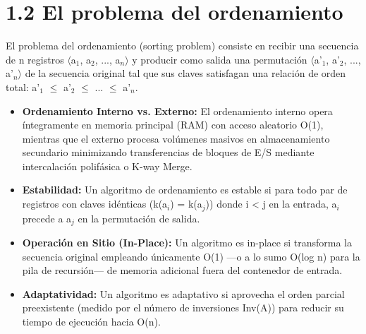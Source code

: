 \documentclass[11pt,letterpaper]{article}
\begin{document}
\section*{1.2 El problema del ordenamiento}
El problema del ordenamiento (sorting problem) consiste en recibir una secuencia de n registros $\langle$a$_1$, a$_2$, ..., a$_n$$\rangle$ y producir como salida una permutación $\langle$a'$_1$, a'$_2$, ..., a'$_n$$\rangle$ de la secuencia original tal que sus claves satisfagan una relación de orden total: a'$_1$ $\le$ a'$_2$ $\le$ ... $\le$ a'$_n$.\par
\begin{itemize}
\setlength{\itemsep}{2pt}\setlength{\parskip}{0pt}
  \item \textbf{Ordenamiento Interno vs. Externo: }El ordenamiento interno opera íntegramente en memoria principal (RAM) con acceso aleatorio O(1), mientras que el externo procesa volúmenes masivos en almacenamiento secundario minimizando transferencias de bloques de E/S mediante intercalación polifásica o K-way Merge.
  \item \textbf{Estabilidad: }Un algoritmo de ordenamiento es estable si para todo par de registros con claves idénticas (k(a$_i$) = k(a$_j$)) donde i < j en la entrada, a$_i$ precede a a$_j$ en la permutación de salida.
  \item \textbf{Operación en Sitio (In-Place): }Un algoritmo es in-place si transforma la secuencia original empleando únicamente O(1) —o a lo sumo O(log n) para la pila de recursión— de memoria adicional fuera del contenedor de entrada.
  \item \textbf{Adaptatividad: }Un algoritmo es adaptativo si aprovecha el orden parcial preexistente (medido por el número de inversiones Inv(A)) para reducir su tiempo de ejecución hacia O(n).
\end{itemize}
\end{document}
